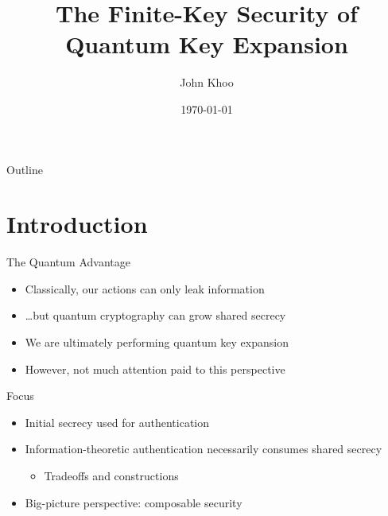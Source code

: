 \documentclass[xcolor=dvipsnames]{beamer}
\title{The Finite-Key Security of Quantum Key Expansion}
\author{John Khoo}
\institute[National University of Singapore] %
{
  Department of Electrical and Computer Engineering \\ \& Department of Computer Science \\
  National University of Singapore
}
\date{\today}
\newcommand{\?}{\mathrel{?}} %
\begin{document}
\begin{frame}
  \titlepage
\end{frame}

\begin{frame}{Outline}
  \tableofcontents
\end{frame}


\section*{Introduction}
\begin{frame}{The Quantum Advantage}
  \begin{itemize}[<+->]
    \item Classically, our actions can only leak information
    \item \ldots but quantum cryptography can \alert{grow shared secrecy}
    \item We are ultimately performing \alert{quantum key expansion}
    \item However, not much attention paid to this perspective
  \end{itemize}
\end{frame}

\begin{frame}{Focus}
  \begin{itemize}[<+->]
    \item Initial secrecy used for authentication
    \item Information-theoretic authentication \alert{necessarily} consumes shared secrecy
    \begin{itemize} \item Tradeoffs and constructions \end{itemize}
    \item Big-picture perspective: \alert{composable security}
  \end{itemize}
\end{frame}
\end{document}
